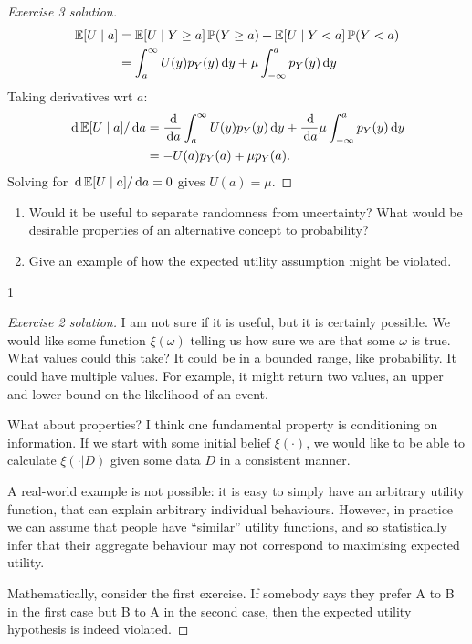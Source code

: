 \documentclass[twoside,a4paper]{article}
\def \solution {0}
\begin{document}
\begin{proof}[Exercise 3 solution]
\begin{align*}
    \mathop{\mbox{\ensuremath{\mathbb{E}}}}\nolimits[U \mid a]
    &=
      \mathop{\mbox{\ensuremath{\mathbb{E}}}}\nolimits[U \mid Y \geq a] \mathop{\mbox{\ensuremath{\mathbb{P}}}}\nolimits(Y \geq a)
      +
      \mathop{\mbox{\ensuremath{\mathbb{E}}}}\nolimits[U \mid Y < a] \mathop{\mbox{\ensuremath{\mathbb{P}}}}\nolimits(Y < a)
    \\
    &=
      \int_{a}^\infty U(y) p_Y(y) \, \mathrm{d} y
      +
      \mu \int_{-\infty}^a p_Y(y) \, \mathrm{d} y
  \end{align*}
  Taking derivatives wrt $a$:
  \begin{align*} 
    \, \mathrm{d} \mathop{\mbox{\ensuremath{\mathbb{E}}}}\nolimits[U \mid a]/\, \mathrm{d} a
    &=
      \frac{\, \mathrm{d}}{\, \mathrm{d} a} \int_{a}^\infty U(y) p_Y(y) \, \mathrm{d} y
      +
      \frac{\, \mathrm{d}}{\, \mathrm{d} a} \mu \int_{-\infty}^a p_Y(y) \, \mathrm{d} y
    \\
    &=
      - U(a) p_Y(a) 
      +
      \mu p_Y(a).
  \end{align*}
  Solving for $\, \mathrm{d} \mathop{\mbox{\ensuremath{\mathbb{E}}}}\nolimits[U \mid a]/\, \mathrm{d} a=0$ gives $U(a) = \mu$.
\end{proof}
\fi
\begin{exercise}
  \begin{enumerate}
    \item Would it be useful to separate randomness from uncertainty? What would be desirable properties of an alternative concept to probability?
  \item Give an example of how the expected utility assumption might be violated.
  \end{enumerate}
\end{exercise}
\if\solution 1
\begin{proof}[Exercise 2 solution]
  I am not sure if it is useful, but it is certainly possible. We would like some function $\xi(\omega)$ telling us how sure we are that some $\omega$ is true. What values could this take? It could be in a bounded range, like probability. It could have multiple values. For example, it might return two values, an upper and lower bound on the likelihood of an event.


  What about properties? I think one fundamental property is conditioning on information. If we start with some initial belief $\xi(\cdot)$, we would like to be able to calculate $\xi(\cdot | D)$ given some data $D$ in a consistent manner.

  A real-world example is not possible: it is easy to simply have an arbitrary utility function, that can explain arbitrary individual behaviours. However, in practice we can assume that people have ``similar'' utility functions, and so statistically infer that their aggregate behaviour may not correspond to maximising expected utility.

  Mathematically, consider the first exercise. If somebody says they prefer A to B in the first case but B to A in the second case, then the expected utility hypothesis is indeed violated.
\end{proof}
\fi
\end{document}
